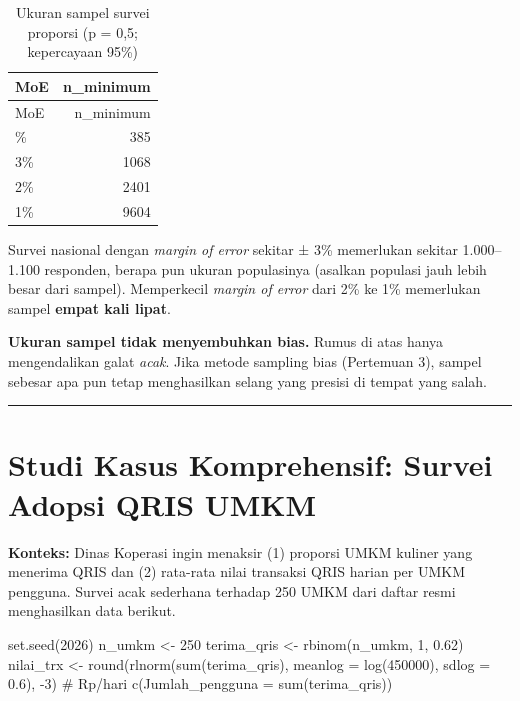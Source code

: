 \documentclass[
  indonesian,
  letterpaper,
]{book}
\newenvironment{Shaded}{\begin{snugshade}}{\end{snugshade}}
\newcommand{\AttributeTok}[1]{\textcolor[rgb]{0.40,0.45,0.13}{#1}}
\newcommand{\CommentTok}[1]{\textcolor[rgb]{0.37,0.37,0.37}{#1}}
\newcommand{\DecValTok}[1]{\textcolor[rgb]{0.68,0.00,0.00}{#1}}
\newcommand{\FloatTok}[1]{\textcolor[rgb]{0.68,0.00,0.00}{#1}}
\newcommand{\FunctionTok}[1]{\textcolor[rgb]{0.28,0.35,0.67}{#1}}
\newcommand{\NormalTok}[1]{\textcolor[rgb]{0.00,0.23,0.31}{#1}}
\newcommand{\OtherTok}[1]{\textcolor[rgb]{0.00,0.23,0.31}{#1}}
\newcommand{\SpecialCharTok}[1]{\textcolor[rgb]{0.37,0.37,0.37}{#1}}
\begin{document}
\begin{longtable}[]{@{}lr@{}}
\caption{Ukuran sampel survei proporsi (p = 0,5; kepercayaan
95\%)}\tabularnewline
\toprule\noalign{}
MoE & n\_minimum \\
\midrule\noalign{}
\endfirsthead
\toprule\noalign{}
MoE & n\_minimum \\
\midrule\noalign{}
\endhead
\bottomrule\noalign{}
\endlastfoot
5\% & 385 \\
3\% & 1068 \\
2\% & 2401 \\
1\% & 9604 \\
\end{longtable}

Survei nasional dengan \emph{margin of error} sekitar ± 3\% memerlukan
sekitar 1.000--1.100 responden, berapa pun ukuran populasinya (asalkan
populasi jauh lebih besar dari sampel). Memperkecil \emph{margin of
error} dari 2\% ke 1\% memerlukan sampel \textbf{empat kali lipat}.

\textbf{Ukuran sampel tidak menyembuhkan bias.} Rumus di atas hanya
mengendalikan galat \emph{acak}. Jika metode sampling bias (Pertemuan
3), sampel sebesar apa pun tetap menghasilkan selang yang presisi di
tempat yang salah.

\begin{center}\rule{0.5\linewidth}{0.5pt}\end{center}

\section{Studi Kasus Komprehensif: Survei Adopsi QRIS
UMKM}\label{studi-kasus-komprehensif-survei-adopsi-qris-umkm}

\textbf{Konteks:} Dinas Koperasi ingin menaksir (1) proporsi UMKM
kuliner yang menerima QRIS dan (2) rata-rata nilai transaksi QRIS harian
per UMKM pengguna. Survei acak sederhana terhadap 250 UMKM dari daftar
resmi menghasilkan data berikut.

\begin{Shaded}
\begin{Highlighting}[]
\FunctionTok{set.seed}\NormalTok{(}\DecValTok{2026}\NormalTok{)}
\NormalTok{n\_umkm }\OtherTok{\textless{}{-}} \DecValTok{250}
\NormalTok{terima\_qris }\OtherTok{\textless{}{-}} \FunctionTok{rbinom}\NormalTok{(n\_umkm, }\DecValTok{1}\NormalTok{, }\FloatTok{0.62}\NormalTok{)}
\NormalTok{nilai\_trx }\OtherTok{\textless{}{-}} \FunctionTok{round}\NormalTok{(}\FunctionTok{rlnorm}\NormalTok{(}\FunctionTok{sum}\NormalTok{(terima\_qris), }\AttributeTok{meanlog =} \FunctionTok{log}\NormalTok{(}\DecValTok{450000}\NormalTok{), }\AttributeTok{sdlog =} \FloatTok{0.6}\NormalTok{), }\SpecialCharTok{{-}}\DecValTok{3}\NormalTok{)  }\CommentTok{\# Rp/hari}
\FunctionTok{c}\NormalTok{(}\AttributeTok{Jumlah\_pengguna =} \FunctionTok{sum}\NormalTok{(terima\_qris))}
\end{Highlighting}
\end{Shaded}
\end{document}
